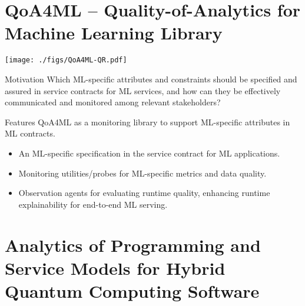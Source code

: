 \documentclass[landscape,a0,final]{a0poster} %
\newcommand{\sectionspace}{10mm} %
\newcommand{\figurespace}{10mm} %
\begin{document}

\vspace{0.005\linewidth}

\centering

\small %

\begin{minipage}{0.98\linewidth}

\begin{minipage}[t]{0.3\linewidth}
\setlength{\parindent}{10mm} %

\vspace{\sectionspace}


\section{QoA4ML -- Quality-of-Analytics for Machine Learning Library}

\begin{center}
    
\texttt{[image: ./figs/QoA4ML-QR.pdf]}
\end{center}
\begin{myframe}{Motivation}
    Which ML-specific attributes and constraints should be specified and assured in service contracts for ML services, and how can they be effectively communicated and monitored among relevant stakeholders?
\end{myframe}

\begin{myframe}{Features}
    QoA4ML as a monitoring library to support ML-specific attributes in ML contracts.
    \begin{itemize}
        \item An ML-specific specification in the service contract for ML applications.
        \item Monitoring utilities/probes for ML-specific metrics and data quality.
        \item Observation agents for evaluating runtime quality, enhancing runtime explainability for end-to-end ML serving.
    \end{itemize}



\end{myframe}
\section{Analytics of Programming and Service Models for Hybrid Quantum Computing Software}


\end{minipage}
\end{minipage}
\end{document}
